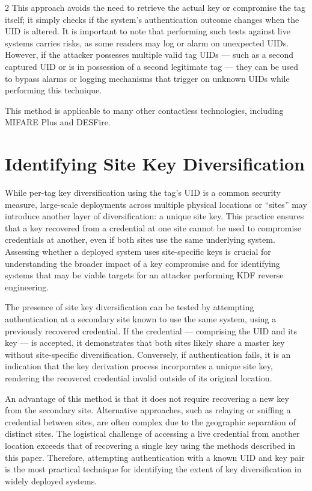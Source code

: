 \documentclass[10pt,letterpaper]{article}
\begin{document}
\begin{multicols}{2}
This approach avoids the need to retrieve the actual key or compromise the tag itself; it simply checks if the system's authentication outcome changes when the UID is altered. It is important to note that performing such tests against live systems carries risks, as some readers may log or alarm on unexpected UIDs. However, if the attacker possesses multiple valid tag UIDs --- such as a second captured UID or is in possession of a second legitimate tag --- they can be used to bypass alarms or logging mechanisms that trigger on unknown UIDs while performing this technique.

This method is applicable to many other contactless technologies, including MIFARE Plus and DESFire.

\section{Identifying Site Key Diversification}
\label{sec:site_kdf}

While per-tag key diversification using the tag's UID is a common security measure, large-scale deployments across multiple physical locations or ``sites'' may introduce another layer of diversification: a unique site key. This practice ensures that a key recovered from a credential at one site cannot be used to compromise credentials at another, even if both sites use the same underlying system. Assessing whether a deployed system uses site-specific keys is crucial for understanding the broader impact of a key compromise and for identifying systems that may be viable targets for an attacker performing KDF reverse engineering.

The presence of site key diversification can be tested by attempting authentication at a secondary site known to use the same system, using a previously recovered credential. If the credential --- comprising the UID and its key --- is accepted, it demonstrates that both sites likely share a master key without site-specific diversification. Conversely, if authentication fails, it is an indication that the key derivation process incorporates a unique site key, rendering the recovered credential invalid outside of its original location.

An advantage of this method is that it does not require recovering a new key from the secondary site. Alternative approaches, such as relaying or sniffing a credential between sites, are often complex due to the geographic separation of distinct sites. The logistical challenge of accessing a live credential from another location exceeds that of recovering a single key using the methods described in this paper. Therefore, attempting authentication with a known UID and key pair is the most practical technique for identifying the extent of key diversification in widely deployed systems.


\end{multicols}
\end{document}
